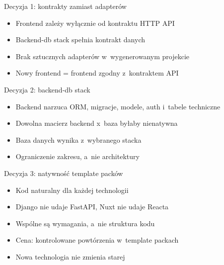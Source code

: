 \documentclass[aspectratio=169, 11pt]{beamer}
\begin{document}
\begin{frame}{Decyzja 1: kontrakty zamiast adapterów}
  \begin{itemize}
    \item Frontend zależy wyłącznie od kontraktu HTTP API
    \item Backend-db stack spełnia kontrakt danych
    \item Brak sztucznych adapterów w~wygenerowanym projekcie
    \item Nowy frontend = frontend zgodny z~kontraktem API
  \end{itemize}
\end{frame}

\begin{frame}{Decyzja 2: backend-db stack}
  \begin{itemize}
    \item Backend narzuca ORM, migracje, modele, auth i~tabele techniczne
    \item Dowolna macierz backend x~baza byłaby nienatywna
    \item Baza danych wynika z~wybranego stacka
    \item Ograniczenie zakresu, a~nie architektury
  \end{itemize}
\end{frame}

\begin{frame}{Decyzja 3: natywność template packów}
  \begin{itemize}
    \item Kod naturalny dla każdej technologii
    \item Django nie udaje FastAPI, Nuxt nie udaje Reacta
    \item Wspólne są wymagania, a~nie struktura kodu
    \item Cena: kontrolowane powtórzenia w~template packach
    \item Nowa technologia nie zmienia starej
  \end{itemize}
\end{frame}
\end{document}
